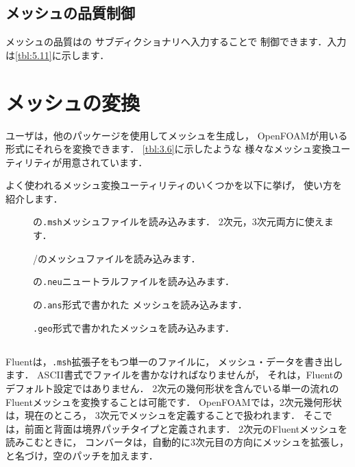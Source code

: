 \subsection{メッシュの品質制御}
\label{ssec:5.4.8}
メッシュの品質はの
サブディクショナリへ入力することで
制御できます．入力は\autoref{tbl:5.11}に示します．



\section{メッシュの変換}
\label{sec:5.5}
ユーザは，他のパッケージを使用してメッシュを生成し，
OpenFOAMが用いる形式にそれらを変換できます．
\autoref{tbl:3.6}に示したような
様々なメッシュ変換ユーティリティが用意されています．

よく使われるメッシュ変換ユーティリティのいくつかを以下に挙げ，
使い方を紹介します．
\begin{description}
 \item[]
%
%
            の\texttt{.msh}メッシュファイルを読み込みます．
            2次元，3次元両方に使えます．
 \item[]
%
%
            /のメッシュファイルを読み込みます．
 \item[]
%
%
            の\texttt{.neu}ニュートラルファイルを読み込みます．
 \item[]
%
%
            の\texttt{.ans}形式で書かれた
            メッシュを読み込みます．
 \item[]
%
%
            \texttt{.geo}形式で書かれたメッシュを読み込みます．
\end{description}


\subsection{}
\label{ssec:5.5.1}
Fluentは，\texttt{.msh}拡張子をもつ単一のファイルに，
メッシュ・データを書き出します．
ASCII書式でファイルを書かなければなりませんが，
それは，Fluentのデフォルト設定ではありません．
2次元の幾何形状を含んでいる単一の流れの
Fluentメッシュを変換することは可能です．
OpenFOAMでは，2次元幾何形状は，現在のところ，
3次元でメッシュを定義することで扱われます．
そこでは，前面と背面は境界パッチタイプと定義されます．
2次元のFluentメッシュを読みこむときに，
コンバータは，自動的に3次元目の方向にメッシュを拡張し，
と名づけ，空のパッチを加えます．

